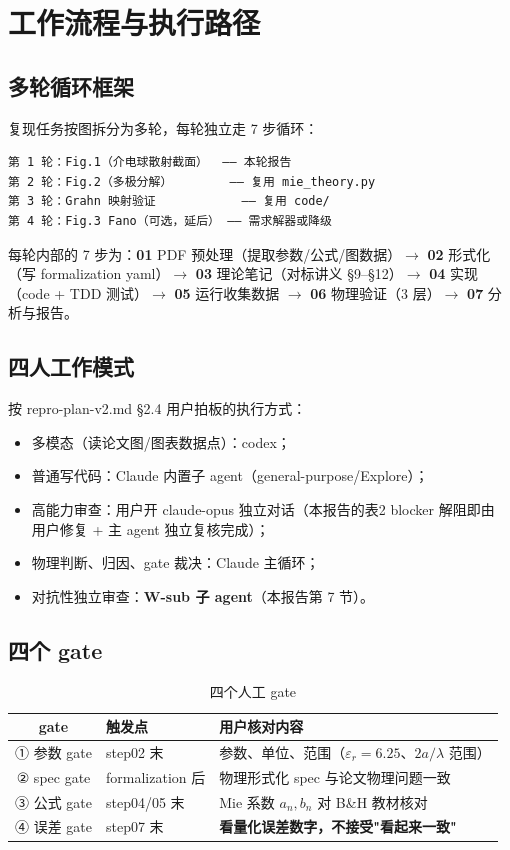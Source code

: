 \section{工作流程与执行路径}

\subsection{多轮循环框架}

复现任务按图拆分为多轮，每轮独立走 7 步循环：

\begin{verbatim}
第 1 轮：Fig.1（介电球散射截面）  —— 本轮报告
第 2 轮：Fig.2（多极分解）        —— 复用 mie_theory.py
第 3 轮：Grahn 映射验证            —— 复用 code/
第 4 轮：Fig.3 Fano（可选，延后） —— 需求解器或降级
\end{verbatim}

每轮内部的 7 步为：\textbf{01} PDF 预处理（提取参数/公式/图数据）$\to$
\textbf{02} 形式化（写 formalization yaml）$\to$
\textbf{03} 理论笔记（对标讲义 §9--§12）$\to$
\textbf{04} 实现（code + TDD 测试）$\to$
\textbf{05} 运行收集数据 $\to$
\textbf{06} 物理验证（3 层）$\to$
\textbf{07} 分析与报告。

\subsection{四人工作模式}

按 repro-plan-v2.md §2.4 用户拍板的执行方式：

\begin{itemize}
  \item 多模态（读论文图/图表数据点）：codex；
  \item 普通写代码：Claude 内置子 agent（general-purpose/Explore）；
  \item 高能力审查：用户开 claude-opus 独立对话（本报告的表2 blocker 解阻即由
        用户修复 + 主 agent 独立复核完成）；
  \item 物理判断、归因、gate 裁决：Claude 主循环；
  \item 对抗性独立审查：\textbf{W-sub 子 agent}（本报告第 7 节）。
\end{itemize}

\subsection{四个 gate}

\begin{table}[H]
\centering
\caption{四个人工 gate}
\begin{tabular}{clp{7cm}}
\toprule
\textbf{gate} & \textbf{触发点} & \textbf{用户核对内容} \\
\midrule
① 参数 gate & step02 末 & 参数、单位、范围（$\varepsilon_r=6.25$、$2a/\lambda$ 范围） \\
② spec gate & formalization 后 & 物理形式化 spec 与论文物理问题一致 \\
③ 公式 gate & step04/05 末 & Mie 系数 $a_n,b_n$ 对 B\&H 教材核对 \\
④ 误差 gate & step07 末 & \textbf{看量化误差数字，不接受"看起来一致"} \\
\bottomrule
\end{tabular}
\end{table}

